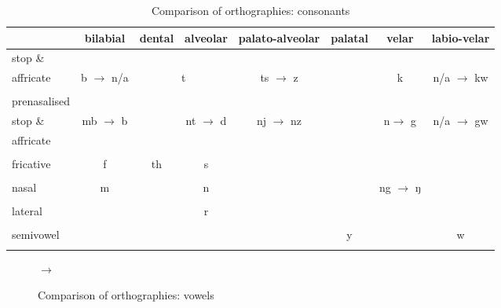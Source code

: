{\renewcommand{\tabcolsep}{2,3pt}
\begin{table}
\caption{Comparison of orthographies: consonants}
\label{orthogcons}
	\begin{tabular}{p{}ccccccc}
		\lsptoprule
		& \scriptsize{bilabial}& \scriptsize{dental} & \scriptsize{alveolar} & \scriptsize{palato-alveolar}	& \scriptsize{palatal} & \scriptsize{velar} & \scriptsize{labio-velar} \\ \midrule
		\scriptsize{stop} \& && \multicolumn{2}{c}{}&&&&\\
		\scriptsize{affricate}	&b $\rightarrow$ n/a& \multicolumn{2}{c}{t}& ts $\rightarrow$ z&& k & n/a $\rightarrow$ kw \\%
		&&&&&&&\\
		\scriptsize{prenasalised} && &&&&&\\
		\scriptsize{stop \&} & mb $\rightarrow$ b & & nt $\rightarrow$ d & nj $\rightarrow$ nz && n\th $\rightarrow$ g & n/a $\rightarrow$ gw\\
		\scriptsize{affricate}&&&&&&&\\%
		&&&&&&&\\
		\scriptsize{fricative} 	& f	& th & s &&&&\\%
		&&&&&&&\\
		\scriptsize{nasal} & m && n &&& ng $\rightarrow$ ŋ & \\%
		&&&&&&&\\
		\scriptsize{lateral} &&& r &&&&\\%
		&&&&&&&\\
		\scriptsize{semivowel} &&&&&y && w\\
		\lspbottomrule
	\end{tabular}
\end{table}}%

\begin{figure}
\centering
{
\begin{vowel}[simple]
\end{vowel}
} $\longrightarrow$
{
\begin{vowel}[simple]
\end{vowel}
}%
\caption{Comparison of orthographies: vowels} \label{orthogvow}
\end{figure}%